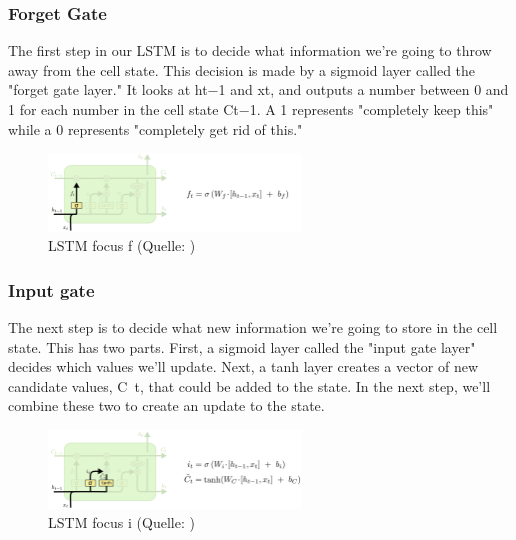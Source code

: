 {\subsubsection{Forget Gate}
The first step in our LSTM is to decide what information we’re going to throw away from the cell state. This decision is made by a sigmoid layer called the "forget gate layer." It looks at ht−1 and xt, and outputs a number between 0 and 1 for each number in the cell state Ct−1. A 1 represents "completely keep this" while a 0 represents "completely get rid of this."
\renewcommand{\figurename}{Abb.}
\begin{figure}[htp]
\centering
\includegraphics[width=0.60\textwidth]{pictures/LSTM3-focus-f.png}
\caption[LSTM focus f]{LSTM focus f (Quelle: \cite{OlahImg})}
\end{figure}

\subsubsection{Input gate}
The next step is to decide what new information we’re going to store in the cell state. This has two parts. First, a sigmoid layer called the "input gate layer" decides which values we’ll update. Next, a tanh layer creates a vector of new candidate values, C~t, that could be added to the state. In the next step, we’ll combine these two to create an update to the state.
\renewcommand{\figurename}{Abb.}
\begin{figure}[htp]
\centering
\includegraphics[width=0.60\textwidth]{pictures/LSTM3-focus-i.png}
\caption[LSTM focus i]{LSTM focus i (Quelle: \cite{OlahImg})}
\end{figure}

}
